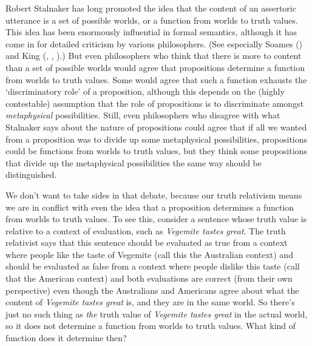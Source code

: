 \documentclass[
  10pt,
  letterpaper,
  DIV=11,
  numbers=noendperiod,
  twoside]{scrartcl}
\begin{document}
Robert Stalnaker has long promoted the idea that the content of an
assertoric utterance is a set of possible worlds, or a function from
worlds to truth values. This idea has been enormously influential in
formal semantics, although it has come in for detailed criticism by
various philosophers. (See especially Soames
() and King
(, ,
).) But even philosophers who think that
there is more to content than a set of possible worlds would agree that
propositions determine a function from worlds to truth values. Some
would agree that such a function exhausts the `discriminatory role' of a
proposition, although this depends on the (highly contestable)
assumption that the role of propositions is to discriminate amongst
\emph{metaphysical} possibilities. Still, even philosophers who disagree
with what Stalnaker says about the nature of propositions could agree
that if all we wanted from a proposition was to divide up some
metaphysical possibilities, propositions could be functions from worlds
to truth values, but they think some propositions that divide up the
metaphysical possibilities the same way should be distinguished.

We don't want to take sides in that debate, because our truth relativism
means we are in conflict with even the idea that a proposition
determines a function from worlds to truth values. To see this, consider
a sentence whose truth value is relative to a context of evaluation,
such as \emph{Vegemite tastes great}. The truth relativist says that
this sentence should be evaluated as true from a context where people
like the taste of Vegemite (call this the Australian context) and should
be evaluated as false from a context where people dislike this taste
(call that the American context) and both evaluations are correct (from
their own perspective) even though the Australians and Americans agree
about what the content of \emph{Vegemite tastes great} is, and they are
in the same world. So there's just no such thing as \emph{the} truth
value of \emph{Vegemite tastes great} in the actual world, so it does
not determine a function from worlds to truth values. What kind of
function does it determine then?
\end{document}
